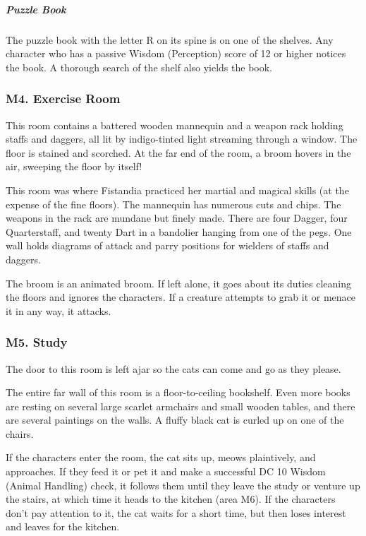\documentclass[10pt,a4paper,twoside,bg=print,twocolumn,openany,nodeprecatedcode]{dndbook}
\begin{document}
\subparagraph{Puzzle Book}
The puzzle book with the letter R on its spine is on one of the shelves. Any character who has a passive Wisdom (Perception) score of 12 or higher notices the book. A thorough search of the shelf also yields the book.

\subsubsection{M4. Exercise Room}
\begin{DndReadAloud}{}
This room contains a battered wooden mannequin and a weapon rack holding staffs and daggers, all lit by indigo-tinted light streaming through a window. The floor is stained and scorched. At the far end of the room, a broom hovers in the air, sweeping the floor by itself!

\end{DndReadAloud}

This room was where Fistandia practiced her martial and magical skills (at the expense of the fine floors). The mannequin has numerous cuts and chips. The weapons in the rack are mundane but finely made. There are four Dagger, four Quarterstaff, and twenty Dart in a bandolier hanging from one of the pegs. One wall holds diagrams of attack and parry positions for wielders of staffs and daggers.

The broom is an animated broom. If left alone, it goes about its duties cleaning the floors and ignores the characters. If a creature attempts to grab it or menace it in any way, it attacks.

\subsubsection{M5. Study}
The door to this room is left ajar so the cats can come and go as they please.

\begin{DndReadAloud}{}
The entire far wall of this room is a floor-to-ceiling bookshelf. Even more books are resting on several large scarlet armchairs and small wooden tables, and there are several paintings on the walls. A fluffy black cat is curled up on one of the chairs.

\end{DndReadAloud}

If the characters enter the room, the cat sits up, meows plaintively, and approaches. If they feed it or pet it and make a successful DC 10 Wisdom (Animal Handling) check, it follows them until they leave the study or venture up the stairs, at which time it heads to the kitchen (area M6). If the characters don't pay attention to it, the cat waits for a short time, but then loses interest and leaves for the kitchen.
\end{document}
